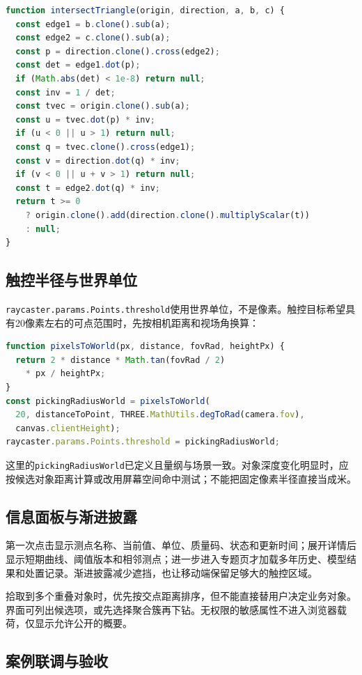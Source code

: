 \begin{lstlisting}[language=JavaScript]
function intersectTriangle(origin, direction, a, b, c) {
  const edge1 = b.clone().sub(a);
  const edge2 = c.clone().sub(a);
  const p = direction.clone().cross(edge2);
  const det = edge1.dot(p);
  if (Math.abs(det) < 1e-8) return null;
  const inv = 1 / det;
  const tvec = origin.clone().sub(a);
  const u = tvec.dot(p) * inv;
  if (u < 0 || u > 1) return null;
  const q = tvec.clone().cross(edge1);
  const v = direction.dot(q) * inv;
  if (v < 0 || u + v > 1) return null;
  const t = edge2.dot(q) * inv;
  return t >= 0
    ? origin.clone().add(direction.clone().multiplyScalar(t))
    : null;
}
\end{lstlisting}

\subsection{触控半径与世界单位}

\texttt{raycaster.params.Points.threshold}使用世界单位，不是像素。触控目标希望具有20像素左右的可点范围时，先按相机距离和视场角换算：

\begin{lstlisting}[language=JavaScript]
function pixelsToWorld(px, distance, fovRad, heightPx) {
  return 2 * distance * Math.tan(fovRad / 2)
    * px / heightPx;
}
const pickingRadiusWorld = pixelsToWorld(
  20, distanceToPoint, THREE.MathUtils.degToRad(camera.fov),
  canvas.clientHeight);
raycaster.params.Points.threshold = pickingRadiusWorld;
\end{lstlisting}

这里的\texttt{pickingRadiusWorld}已定义且量纲与场景一致。对象深度变化明显时，应按候选对象距离计算或改用屏幕空间命中测试；不能把固定像素半径直接当成米。

\subsection{信息面板与渐进披露}

第一次点击显示测点名称、当前值、单位、质量码、状态和更新时间；展开详情后显示短期曲线、阈值版本和相邻测点；进一步进入专题页才加载多年历史、模型结果和处置记录。渐进披露减少遮挡，也让移动端保留足够大的触控区域。

拾取到多个重叠对象时，优先按交点距离排序，但不能直接替用户决定业务对象。界面可列出候选项，或先选择聚合簇再下钻。无权限的敏感属性不进入浏览器载荷，仅显示允许公开的概要。

\subsection{案例联调与验收}

